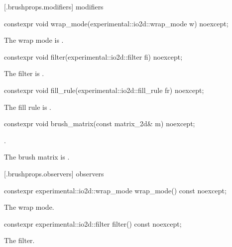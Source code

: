  [\iotwod.brushprops.modifiers] { modifiers}

%
\begin{itemdecl}
constexpr void wrap_mode(experimental::io2d::wrap_mode w) noexcept;
\end{itemdecl}
\begin{itemdescr}
\pnum
\effects
The wrap mode is .
\end{itemdescr}

%
\begin{itemdecl}
constexpr void filter(experimental::io2d::filter fi) noexcept;
\end{itemdecl}
\begin{itemdescr}
\pnum
\effects
The filter is .
\end{itemdescr}

%
\begin{itemdecl}
constexpr void fill_rule(experimental::io2d::fill_rule fr) noexcept;
\end{itemdecl}
\begin{itemdescr}
\pnum
\effects
The fill rule is .
\end{itemdescr}

%
\begin{itemdecl}
constexpr void brush_matrix(const matrix_2d& m) noexcept;
\end{itemdecl}
\begin{itemdescr}
\pnum
\requires
{}.

\pnum
\effects
The brush matrix is .
\end{itemdescr}

 [\iotwod.brushprops.observers] { observers}

%
\begin{itemdecl}
constexpr experimental::io2d::wrap_mode wrap_mode() const noexcept;
\end{itemdecl}
\begin{itemdescr}
\pnum
\returns
The wrap mode.
\end{itemdescr}

%
\begin{itemdecl}
constexpr experimental::io2d::filter filter() const noexcept;
\end{itemdecl}
\begin{itemdescr}
\pnum
\returns
The filter.
\end{itemdescr}

